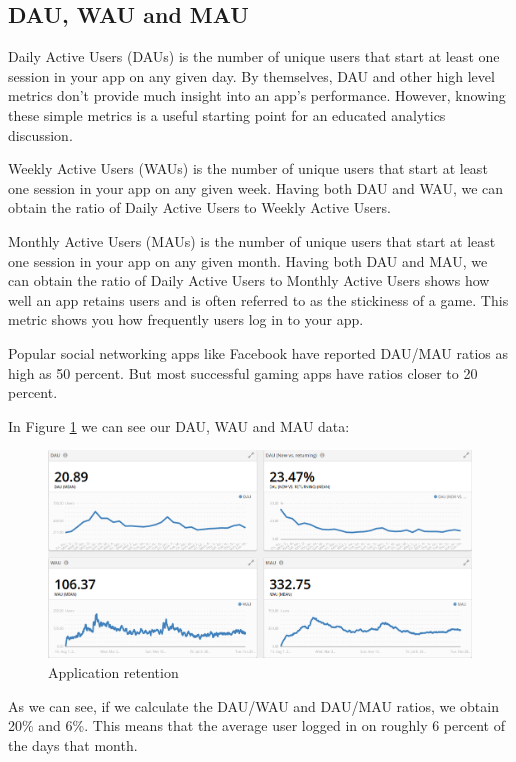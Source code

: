 \subsection{DAU, WAU and MAU}

Daily Active Users (DAUs) is the number of unique users that start at least one session in your app on any given day. By themselves, DAU and other high level metrics don’t provide much insight into an app’s performance. However, knowing these simple metrics is a useful starting point for an educated analytics discussion.

Weekly Active Users (WAUs) is the number of unique users that start at least one session in your app on any given week. Having both DAU and WAU, we can obtain the ratio of Daily Active Users to Weekly Active Users.

Monthly Active Users (MAUs) is the number of unique users that start at least one session in your app on any given month. Having both DAU and MAU, we can obtain the ratio of Daily Active Users to Monthly Active Users shows how well an app retains users and is often referred to as the stickiness of a game. This metric shows you how frequently users log in to your app.

Popular social networking apps like Facebook have reported DAU/MAU ratios as high as 50 percent. But most successful gaming apps have ratios closer to 20 percent.~\cite{gametrics2}

In Figure \ref{fig:app-dau} we can see our DAU, WAU and MAU data:

\begin{figure}[h]
\centering
\includegraphics[width=350pt]{graphics/evaluation/app_dau.png}
\caption{Application retention}
\label{fig:app-dau}
\end{figure}

\FloatBarrier

As we can see, if we calculate the DAU/WAU and DAU/MAU ratios, we obtain 20\% and 6\%. This means that the average user logged in on roughly 6 percent of the days that month.

